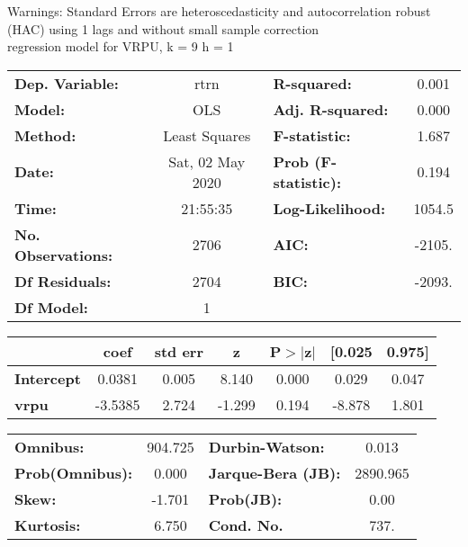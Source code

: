 Warnings: \newline
 [1] Standard Errors are heteroscedasticity and autocorrelation robust (HAC) using 1 lags and without small sample correction\\ 

regression model for VRPU, k = 9 h = 1\begin{center}
\begin{tabular}{lclc}
\toprule
\textbf{Dep. Variable:}    &       rtrn       & \textbf{  R-squared:         } &     0.001   \\
\textbf{Model:}            &       OLS        & \textbf{  Adj. R-squared:    } &     0.000   \\
\textbf{Method:}           &  Least Squares   & \textbf{  F-statistic:       } &     1.687   \\
\textbf{Date:}             & Sat, 02 May 2020 & \textbf{  Prob (F-statistic):} &    0.194    \\
\textbf{Time:}             &     21:55:35     & \textbf{  Log-Likelihood:    } &    1054.5   \\
\textbf{No. Observations:} &        2706      & \textbf{  AIC:               } &    -2105.   \\
\textbf{Df Residuals:}     &        2704      & \textbf{  BIC:               } &    -2093.   \\
\textbf{Df Model:}         &           1      & \textbf{                     } &             \\
\bottomrule
\end{tabular}
\begin{tabular}{lcccccc}
                   & \textbf{coef} & \textbf{std err} & \textbf{z} & \textbf{P$> |$z$|$} & \textbf{[0.025} & \textbf{0.975]}  \\
\midrule
\textbf{Intercept} &       0.0381  &        0.005     &     8.140  &         0.000        &        0.029    &        0.047     \\
\textbf{vrpu}      &      -3.5385  &        2.724     &    -1.299  &         0.194        &       -8.878    &        1.801     \\
\bottomrule
\end{tabular}
\begin{tabular}{lclc}
\textbf{Omnibus:}       & 904.725 & \textbf{  Durbin-Watson:     } &    0.013  \\
\textbf{Prob(Omnibus):} &   0.000 & \textbf{  Jarque-Bera (JB):  } & 2890.965  \\
\textbf{Skew:}          &  -1.701 & \textbf{  Prob(JB):          } &     0.00  \\
\textbf{Kurtosis:}      &   6.750 & \textbf{  Cond. No.          } &     737.  \\
\bottomrule
\end{tabular}
\end{center}

